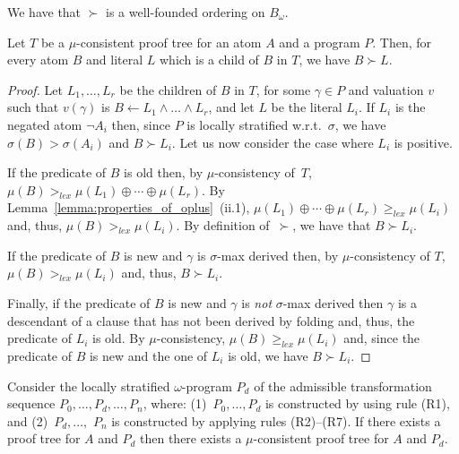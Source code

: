 \documentclass[english]{tlp}
\renewcommand{\mathit}{\displaystyle}
\begin{document}
We have that $\succ$ is a well-founded  ordering on $B_{\omega}$.

\begin{lemma}\label{lemma:wfo} Let $T$ be a $\mu$-consistent proof tree 
for an atom $A$
and a program $P$. Then, for every atom \(B\) and literal \( L \)
which is a child of \( B \) in \( T \), we have $B\succ L$.
\end{lemma}

\begin{proof}
Let $L_1,\ldots,L_r$ be the children of $B$ in $T$, for some \(
\gamma \in P \) and valuation \( v \) such that \( v(\gamma ) \) is
\( B\leftarrow L_{1}\wedge \ldots \wedge L_{r} \), and let $L$ be
the literal $L_i$. If $L_i$ is the negated atom $\neg A_i$ then,
since $P$ is locally stratified w.r.t.~$\sigma$, we have $\sigma(B)
> \sigma (A_i)$ and $B\succ L_i$. Let us now consider the case where
$L_i$ is positive. 

If the predicate of $B$ is old then, by
$\mu$-consistency of~$T$, $\mu(B)>_{\mathit{lex}}\mu(L_1)
\oplus\cdots\oplus\mu(L_r)$. By
Lemma~\ref{lemma:properties_of_oplus}~(ii.1), $\mu(L_1)
\oplus\cdots\oplus\mu(L_r)\geq_{\mathit{lex}}\mu(L_i)$ and, thus,
$\mu(B)>_{\mathit{lex}}\mu(L_i)$. By definition of~$\succ$, we have 
that $B\succ L_i$. 

If the predicate of $B$ is new and $\gamma$ is $\sigma$-max
derived then, by $\mu$-consistency of $T$,
$\mu(B)>_{\mathit{lex}}\mu(L_i)$ and, thus,
$B\succ L_i$. 

Finally, if the predicate of $B$ is new and
 $\gamma$ is {\emph{not}} $\sigma$-max derived then
$\gamma$ is a descendant of a clause that has not been derived 
by folding and, thus, the predicate of $L_i$ is old. By
$\mu$-consistency, $\mu(B)\geq_{\mathit{lex}}\mu(L_i)$ and, since
the predicate of $B$ is new and the one of $L_i$ is old, we have
$B\succ L_i$.
\end{proof}


\begin{lemma} \label{lem:muconsistent-prooftree}
Consider the locally stratified $\omega$-program $P_d$ of the admissible transformation 
sequence $P_0,\ldots,P_d,\ldots,P_n$,
where\/{\rm{:}} {\rm{(1)}}~\(
P_{0},\ldots ,P_{d} \) is constructed by using rule {\rm{(R1)}}, and
 {\rm{(2)}}~$P_{d},\ldots,$ $P_{n}$ is constructed by 
 applying rules {\rm{(R2)}}--{\rm{(R7)}}. 
If there exists a proof tree
for $A$ and $P_d$ then there exists a \mbox{$\mu$-consistent} proof tree for $A$ and $P_d$.
\end{lemma}
\end{document}
